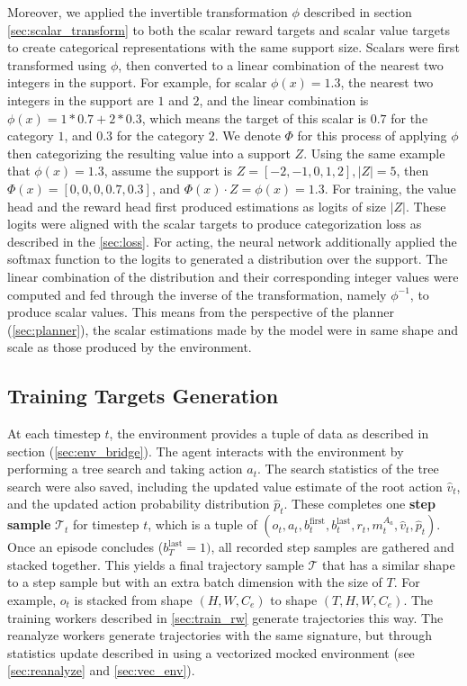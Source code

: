 Moreover, we applied the invertible transformation \( \phi \) described in section \ref{sec:scalar_transform} to both the scalar reward targets and scalar value targets to create categorical representations with the same support size.
Scalars were first transformed using \( \phi \), then converted to a linear combination of the nearest two integers in the support.
For example, for scalar \(\phi(x) = 1.3\), the nearest two integers in the support are $1$ and $2$, and the linear combination is \( \phi(x) = 1 * 0.7 + 2 * 0.3 \), which means the target of this scalar is $0.7$ for the category $1$, and $0.3$ for the category $2$.
We denote $\Phi$ for this process of applying $\phi$ then categorizing the resulting value into a support $Z$.
Using the same example that $\phi(x) = 1.3$, assume the support is $Z = [-2, -1, 0, 1, 2], |Z| = 5$,
then $\Phi(x) = [0, 0, 0, 0.7, 0.3]$, and $\Phi(x) \cdot Z = \phi(x) = 1.3$.
For training, the value head and the reward head first produced estimations as logits of size $|Z|$.
These logits were aligned with the scalar targets to produce categorization loss as described in the \ref{sec:loss}.
For acting, the neural network additionally applied the softmax function to the logits to generated a distribution over the support.
The linear combination of the distribution and their corresponding integer values were computed and fed through the inverse of the transformation, namely \( \phi^{-1}\), to produce scalar values.
This means from the perspective of the planner (\ref{sec:planner}), the scalar estimations made by the model were in same shape and scale as those produced by the environment.

\subsection{Training Targets Generation} \label{sec:targets}
At each timestep $t$, the environment provides a tuple of data as described in section (\ref{sec:env_bridge}).
The agent interacts with the environment by performing a tree search and taking action $a_t$.
The search statistics of the tree search were also saved, including the updated value estimate of the root action $\hat{v}_t$,
and the updated action probability distribution $\hat{p}_t$.
These completes one \textbf{step sample} $\mathcal{T}_t$ for timestep $t$, which is a tuple of $(o_t, a_t, b^{\text{first}}_{t}, b^{\text{last}}_{t}, r_t, m^{A_a}_t, \hat{v}_t, \hat{p}_t)$.
Once an episode concludes ($b^{\text{last}}_{T} = 1)$, all recorded step samples are gathered and stacked together.
This yields a final trajectory sample $\mathcal{T}$ that has a similar shape to a step sample but with an extra batch dimension with the size of $T$.
For example, $o_t$ is stacked from shape $(H, W, C_e)$ to shape $(T, H, W, C_e)$.
The training workers described in \ref{sec:train_rw} generate trajectories this way.
The reanalyze workers generate trajectories with the same signature, but through statistics update described in using a vectorized mocked environment (see \ref{sec:reanalyze} and \ref{sec:vec_env}).

